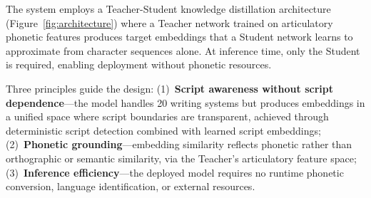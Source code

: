 \documentclass[11pt,a4paper]{article}
\begin{document}
The system employs a Teacher-Student knowledge distillation architecture~\citep{hinton2015distilling} (Figure~\ref{fig:architecture}) where a Teacher network trained on articulatory phonetic features produces target embeddings that a Student network learns to approximate from character sequences alone. At inference time, only the Student is required, enabling deployment without phonetic resources.

Three principles guide the design: (1)~\textbf{Script awareness without script dependence}---the model handles 20 writing systems but produces embeddings in a unified space where script boundaries are transparent, achieved through deterministic script detection combined with learned script embeddings; (2)~\textbf{Phonetic grounding}---embedding similarity reflects phonetic rather than orthographic or semantic similarity, via the Teacher's articulatory feature space; (3)~\textbf{Inference efficiency}---the deployed model requires no runtime phonetic conversion, language identification, or external resources.
\end{document}
